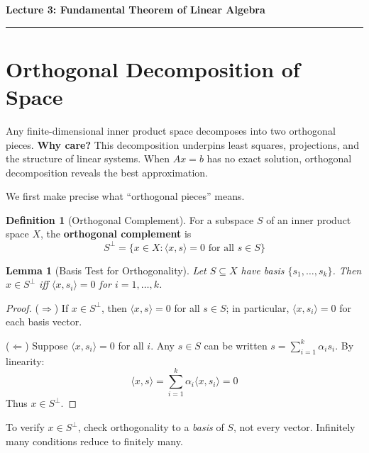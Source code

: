 \documentclass[10pt, twocolumn]{article}
\theoremstyle{definition}
\newtheorem{definition}{Definition}
\theoremstyle{plain}
\newtheorem{lemma}{Lemma}
\begin{document}
\noindent
\begin{minipage}{\linewidth}
    \centering
    \textbf{\Large Lecture 3: Fundamental Theorem of Linear Algebra} \\[0.5em]
    \hrule
\end{minipage}
\vspace{1em}

\section{Orthogonal Decomposition of Space}

Any finite-dimensional inner product space decomposes into two orthogonal pieces. \textbf{Why care?} This decomposition underpins least squares, projections, and the structure of linear systems. When $Ax = b$ has no exact solution, orthogonal decomposition reveals the best approximation.

We first make precise what ``orthogonal pieces'' means.

\begin{definition}[Orthogonal Complement]
For a subspace $S$ of an inner product space $X$, the \textbf{orthogonal complement} is
\[
    S^\perp = \{x \in X : \langle x, s \rangle = 0 \text{ for all } s \in S\}
\]
\end{definition}

\begin{lemma}[Basis Test for Orthogonality]\label{lem:basis-test}
Let $S \subseteq X$ have basis $\{s_1, \ldots, s_k\}$. Then $x \in S^\perp$ iff $\langle x, s_i \rangle = 0$ for $i = 1, \ldots, k$.
\end{lemma}

\begin{proof}
($\Rightarrow$) If $x \in S^\perp$, then $\langle x, s \rangle = 0$ for all $s \in S$; in particular, $\langle x, s_i \rangle = 0$ for each basis vector.

($\Leftarrow$) Suppose $\langle x, s_i \rangle = 0$ for all $i$. Any $s \in S$ can be written $s = \sum_{i=1}^k \alpha_i s_i$. By linearity:
\[
\langle x, s \rangle = \sum_{i=1}^k \alpha_i \langle x, s_i \rangle = 0
\]
Thus $x \in S^\perp$.
\end{proof}

\begin{tcolorbox}[colframe=black!50, title={\small Practical Implication}]
To verify $x \in S^\perp$, check orthogonality to a \emph{basis} of $S$, not every vector. Infinitely many conditions reduce to finitely many.
\end{tcolorbox}
\end{document}
